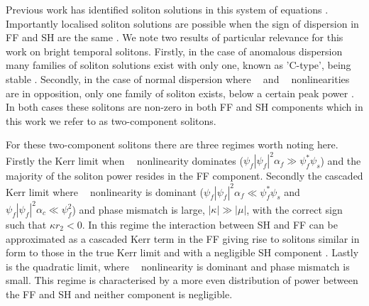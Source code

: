 \documentclass[reprint,
 amsmath,amssymb,
 pra,
]{revtex4-1}
\DeclareMathOperator{\chitwo}{ {\chi}^{(2)} }
\DeclareMathOperator{\chithree}{ {\chi}^{(3)} }
\begin{document}
Previous work has identified soliton solutions in this system of equations \cite{Buryak2002, Buryak1995OpticalNonlinearities}. Importantly localised soliton solutions are possible when the sign of dispersion in FF and SH are the same \cite{Rowe2019TemporalNanowaveguides}. We note two results of particular relevance for this work on bright temporal solitons. Firstly, in the case of anomalous dispersion many families of soliton solutions exist with only one, known as 'C-type', being stable \cite{Buryak1995OpticalNonlinearities}. Secondly, in the case of normal dispersion where $\chithree$ and $\chitwo$ nonlinearities are in opposition, only one family of soliton exists, below a certain peak power \cite{Buryak1995OpticalNonlinearities}. In both cases these solitons are non-zero in both FF and SH components which in this work we refer to as two-component solitons.

For these two-component solitons there are three regimes worth noting here. Firstly the Kerr limit when $\chithree$ nonlinearity dominates ($\psi_f|\psi_f|^2\alpha_f\gg \psi_f^*\psi_s$) and the majority of the soliton power resides in the FF component. Secondly the cascaded Kerr limit where $\chitwo$ nonlinearity is dominant ($\psi_f|\psi_f|^2\alpha_f\ll \psi_f^*\psi_s$ and $\psi_f|\psi_f|^2\alpha_c\ll \psi_f^2$) and phase mismatch is large, $|\kappa| \gg |\mu|$, with the correct sign such that $ \kappa r_2 < 0$. In this regime the interaction between SH and FF can be approximated as a cascaded Kerr term in the FF giving rise to solitons similar in form to those in the true Kerr limit and with a negligible SH component \cite{Buryak2002}. Lastly is the quadratic limit, where $\chitwo$ nonlinearity is dominant and phase mismatch is small. This regime is characterised by a more even distribution of power between the FF and SH and neither component is negligible.
\end{document}
